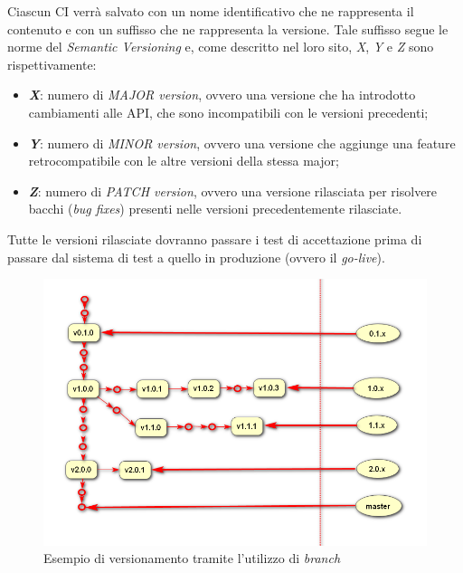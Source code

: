 	Ciascun CI verrà salvato con un nome identificativo che ne rappresenta il contenuto e con un suffisso che ne rappresenta la versione.
	Tale suffisso segue le norme del \textit{Semantic Versioning}\cite{semantic} e, come descritto nel loro sito, \textit{X}, \textit{Y} e \textit{Z} sono rispettivamente:
	
	\begin{itemize}[noitemsep]
		\item \textbf{\textit{X}}: numero di \textit{MAJOR version}, ovvero una versione che ha introdotto cambiamenti alle API, che sono incompatibili con le versioni precedenti;
		\item \textit{\textbf{Y}}: numero di \textit{MINOR version}, ovvero una versione che aggiunge una feature retrocompatibile con le altre versioni della stessa major;
		\item \textit{\textbf{Z}}: numero di \textit{PATCH version}, ovvero una versione rilasciata per risolvere bacchi (\textit{bug fixes}) presenti nelle versioni precedentemente rilasciate.
	\end{itemize}
	
	Tutte le versioni rilasciate dovranno passare i test di accettazione prima di passare dal sistema di test a quello in produzione (ovvero il \textit{go-live}).
	
	\begin{figure}[h!]
		\centering
		\includegraphics[width=\linewidth]{img/branches.png}
		\caption{Esempio di versionamento tramite l'utilizzo di \textit{branch}}
		\label{fig:branches}
	\end{figure}

